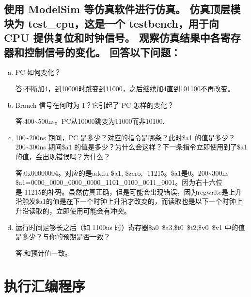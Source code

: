\documentclass{ctexart}
\begin{document}
        \subsection  { 使用 ModelSim 等仿真软件进行仿真。 仿真顶层模块为 test\_cpu，这是一个 testbench，用于向 CPU 提供复位和时钟信号。 观察仿真结果中各寄存器和控制信号的变化。 回答以下问题：}
        \begin{enumerate}[a)] 
            \item{ PC 如何变化？}

              答:不断加4，到10000时跳变到11000，之后继续加4直到101100不再改变。

            \item{Branch 信号在何时为 1？它引起了 PC 怎样的变化？}

                答:400\~{}500ns。PC从10000跳变为11000而非10100.

            \item{100\~{}200ns 期间，PC 是多少？对应的指令是哪条？此时\$a1 的值是多少？200\~{}300ns 期间\$a1 的值是多少？为什么会这样？下一条指令立即使用到了\$a1 的值，会出现错误吗？为什么？}
    
                答:0x00000004。对应的是addiu \$a1, \$zero, -11215。\$a1是0。200\~{}300ns
                \$a1=0000\_0000\_0000\_0000\_1101\_0100\_0011\_0001。因为右十六位是-11215的补码。虽然仿真正确，但是可能会出现错误，因为regwrite是上升沿触发\$a1的值是在下一个时钟上升沿才改变的，而读取也是以下一个时钟上升沿读取的，立即使用可能会有冲突。

            \item{运行时间足够长之后（如 1100ns 时）寄存器\$a0~\$a3,\$t0~\$t2,\$v0~\$v1 中的值是多少？与你的预期是否一致？}

        答:和预计值一致。
  \end{enumerate}
\section{执行汇编程序}
\end{document}

